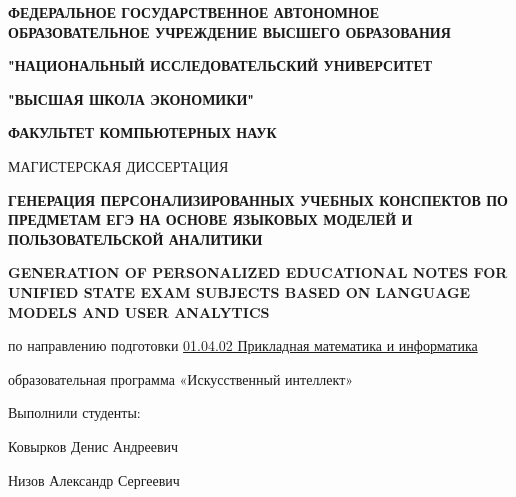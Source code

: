 \begin{titlepage}
\thispagestyle{empty}

\begin{center}
{\bfseries\fontsize{12}{14}\selectfont
ФЕДЕРАЛЬНОЕ ГОСУДАРСТВЕННОЕ АВТОНОМНОЕ ОБРАЗОВАТЕЛЬНОЕ УЧРЕЖДЕНИЕ ВЫСШЕГО ОБРАЗОВАНИЯ\par}
{\bfseries\fontsize{12}{14}\selectfont
"НАЦИОНАЛЬНЫЙ ИССЛЕДОВАТЕЛЬСКИЙ УНИВЕРСИТЕТ\par}
{\bfseries\fontsize{12}{14}\selectfont
"ВЫСШАЯ ШКОЛА ЭКОНОМИКИ"\par}
{\bfseries\fontsize{12}{14}\selectfont
ФАКУЛЬТЕТ КОМПЬЮТЕРНЫХ НАУК\par}
\end{center}


\begin{center}
{\fontsize{13}{19.5}\selectfont МАГИСТЕРСКАЯ ДИССЕРТАЦИЯ\par}
\vspace{0.3cm}
{\bfseries\fontsize{12}{18}\selectfont
ГЕНЕРАЦИЯ ПЕРСОНАЛИЗИРОВАННЫХ УЧЕБНЫХ КОНСПЕКТОВ ПО ПРЕДМЕТАМ ЕГЭ НА ОСНОВЕ ЯЗЫКОВЫХ МОДЕЛЕЙ И ПОЛЬЗОВАТЕЛЬСКОЙ АНАЛИТИКИ\par}

\vspace{0.5cm}

{\bfseries\fontsize{13}{19.5}\selectfont
GENERATION OF PERSONALIZED EDUCATIONAL NOTES FOR UNIFIED STATE EXAM SUBJECTS BASED ON LANGUAGE MODELS AND USER ANALYTICS\par}

\vspace{0.5cm}

{\fontsize{13}{19.5}\selectfont
по направлению подготовки \underline{01.04.02 Прикладная математика и информатика}\par}
{\fontsize{13}{19.5}\selectfont
образовательная программа «Искусственный интеллект»\par}
\end{center}

\vspace{0.5cm}

\begin{flushright}
{\fontsize{14}{16}\selectfont Выполнили студенты:\par}
{\fontsize{14}{16}\selectfont Ковырков Денис Андреевич\par}
{\fontsize{14}{16}\selectfont Низов Александр Сергеевич\par}


\end{flushright}
\end{titlepage}
